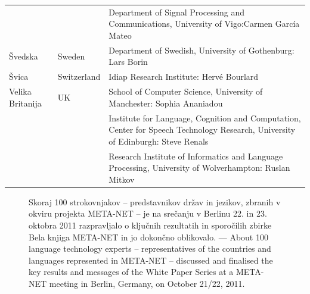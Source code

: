 \begin{longtable}{@{}llp{113mm}@{}}
  & & Department of Signal Processing and Communications, University of Vigo:\newline Carmen García Mateo \\ \addlinespace 
  Švedska & \textcolor{grey1}{Sweden} & Department of Swedish, University of Gothenburg: Lars Borin \\ \addlinespace 
  Švica & \textcolor{grey1}{Switzerland} & Idiap Research Institute: Hervé Bourlard \\ \addlinespace 
  Velika Britanija & \textcolor{grey1}{UK} & School of Computer Science, University of Manchester: Sophia Ananiadou \\ \addlinespace
  & & Institute for Language, Cognition and Computation, Center for Speech Technology Research, University of Edinburgh: Steve Renals \\ \addlinespace 
  & & Research Institute of Informatics and Language Processing, University of Wolverhampton: Ruslan Mitkov%
\end{longtable}
\normalsize

\renewcommand*{\figureformat}{}
\renewcommand*{\captionformat}{}

\begin{figure}[htbp]
  \center
  \caption{Skoraj 100 strokovnjakov -- predstavnikov držav in jezikov, zbranih v okviru projekta META-NET -- je na srečanju v Berlinu 22. in 23. oktobra 2011 razpravljalo o ključnih rezultatih in sporočilih zbirke Bela knjiga META-NET in jo dokončno oblikovalo. --- \textcolor{grey1}{About 100 language technology experts -- representatives of the countries and languages represented in META-NET -- discussed and finalised the key results and messages of the White Paper Series at a META-NET meeting in Berlin, Germany, on October 21/22, 2011.}}\medskip
\end{figure}

\cleardoublepage

\label{whitepaperseries}

